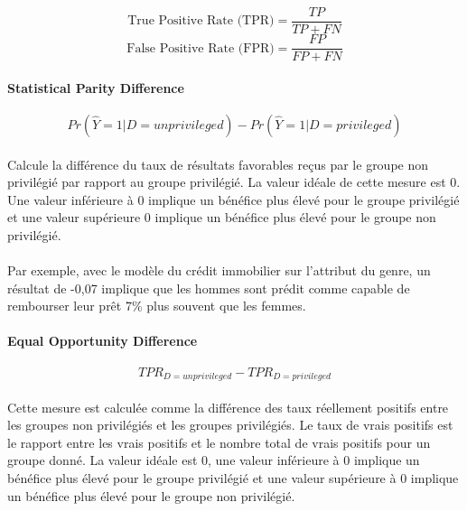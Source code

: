 \documentclass[10pt, french, a4paper]{report}
\begin{document}
\begin{equation}\label{eq:tpr}
  \text{True Positive Rate (TPR)} = \frac{TP}{TP + FN}
\end{equation}
\begin{equation}\label{eq:tpr}
  \text{False Positive Rate (FPR)} = \frac{FP}{FP + FN}
\end{equation}

\paragraph{Statistical Parity Difference}
\begin{equation}\label{eq:stat_par_diff}
  Pr(\hat{Y} = 1 | D = unprivileged) - Pr(\hat{Y} = 1 | D = privileged)
\end{equation}

\paragraph{}
Calcule la différence du taux de résultats favorables reçus par le groupe non privilégié par rapport au groupe privilégié. La valeur idéale de cette mesure est 0. Une valeur inférieure à 0 implique un bénéfice plus élevé pour le groupe privilégié et une valeur supérieure 0 implique un bénéfice plus élevé pour le groupe non privilégié.

\paragraph{}
Par exemple, avec le modèle du crédit immobilier sur l'attribut du genre, un résultat de -0,07 implique que les hommes sont prédit comme capable de rembourser leur prêt 7\% plus souvent que les femmes.

\paragraph{Equal Opportunity Difference}

\begin{equation}\label{eq:eq_oppo_diff}
  TPR_{D = unprivileged} - TPR_{D = privileged}
\end{equation}

\paragraph{}
Cette mesure est calculée comme la différence des taux réellement positifs entre les groupes non privilégiés et les groupes privilégiés. Le taux de vrais positifs est le rapport entre les vrais positifs et le nombre total de vrais positifs pour un groupe donné. La valeur idéale est 0, une valeur inférieure à 0 implique un bénéfice plus élevé pour le groupe privilégié et une valeur supérieure à 0 implique un bénéfice plus élevé pour le groupe non privilégié.
\end{document}
